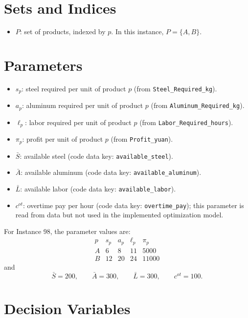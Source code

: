 \section*{Sets and Indices}

\begin{itemize}
    \item $P$: set of products, indexed by $p$. In this instance, $P=\{A,B\}$.
\end{itemize}

\section*{Parameters}

\begin{itemize}
    \item $s_p$: steel required per unit of product $p$ (from \texttt{Steel\_Required\_kg}).
    \item $a_p$: aluminum required per unit of product $p$ (from \texttt{Aluminum\_Required\_kg}).
    \item $\ell_p$: labor required per unit of product $p$ (from \texttt{Labor\_Required\_hours}).
    \item $\pi_p$: profit per unit of product $p$ (from \texttt{Profit\_yuan}).
    \item $\bar S$: available steel (code data key: \texttt{available\_steel}).
    \item $\bar A$: available aluminum (code data key: \texttt{available\_aluminum}).
    \item $\bar L$: available labor (code data key: \texttt{available\_labor}).
    \item $c^{ot}$: overtime pay per hour (code data key: \texttt{overtime\_pay}); this parameter is read from data but not used in the implemented optimization model.
\end{itemize}

For Instance 98, the parameter values are:
\[
\begin{array}{c|cccc}
p & s_p & a_p & \ell_p & \pi_p \\ \hline
A & 6 & 8 & 11 & 5000 \\
B & 12 & 20 & 24 & 11000
\end{array}
\]
and
\[
\bar S=200,\qquad \bar A=300,\qquad \bar L=300,\qquad c^{ot}=100.
\]

\section*{Decision Variables}

